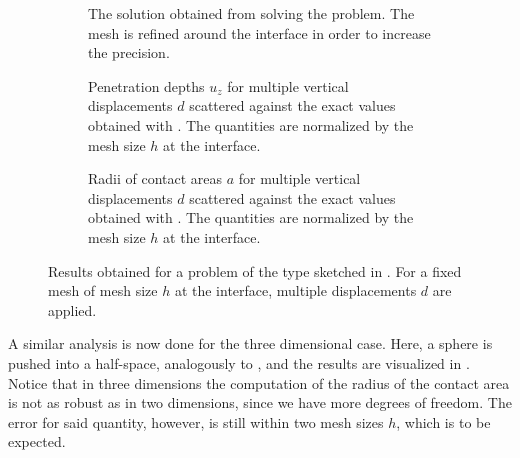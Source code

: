 \documentclass[11pt, a4paper]{article}
\begin{document}
\begin{figure}[H]
\centering
\begin{subfigure}[b]{\textwidth}
     
     \caption{The solution obtained from solving the problem. The mesh is refined around the interface in order to increase the precision.}
     \label{fig:solution-2d}
\end{subfigure}
\begin{subfigure}[t]{.49\textwidth}
    \hspace{12pt}
    
    \caption{Penetration depths $u_z$ for multiple vertical displacements $d$ scattered against the exact values obtained with . The quantities are normalized by the mesh size $h$ at the interface.}
    \label{fig:normal-displacements}
\end{subfigure}
\begin{subfigure}[t]{.49\textwidth}
     
     \caption{Radii of contact areas $a$ for multiple vertical displacements $d$ scattered against the exact values obtained with . The quantities are normalized by the mesh size $h$ at the interface.}
     \label{fig:contact-radius}
\end{subfigure}
\caption{Results obtained for a problem of the type sketched in . For a fixed mesh of mesh size $h$ at the interface, multiple displacements $d$ are applied.}
\label{fig:contact-plane-circle}
\end{figure}

A similar analysis is now done for the three dimensional case. Here, a sphere is pushed into a half-space, analogously to , and the results are visualized in . Notice that in three dimensions the computation of the radius of the contact area is not as robust as in two dimensions, since we have more degrees of freedom. The error for said quantity, however, is still within two mesh sizes $h$, which is to be expected.
\end{document}
